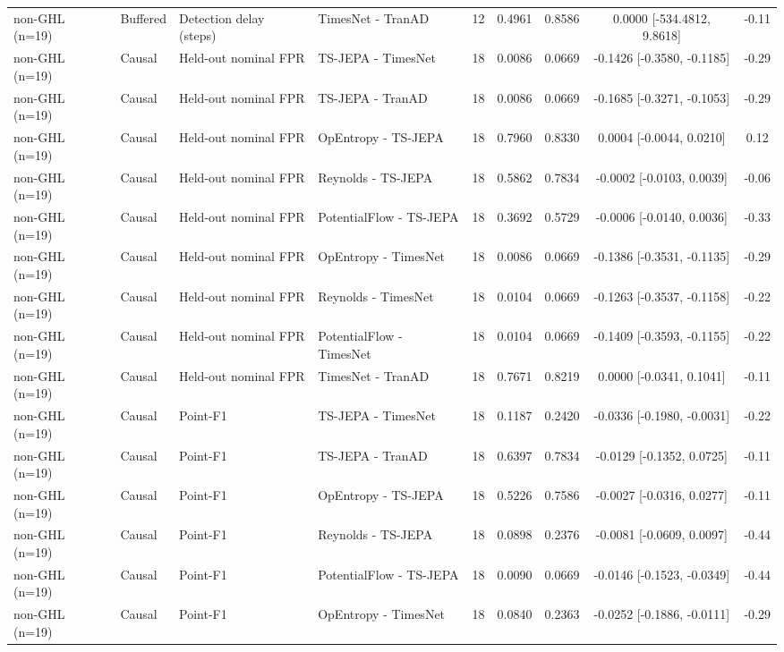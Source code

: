 \begin{table}[t]
\begin{tabular}{@{}llllccccc@{}}
non-GHL (n=19) & Buffered & Detection delay (steps) & TimesNet - TranAD & 12 & 0.4961 & 0.8586 & 0.0000 [-534.4812, 9.8618] & -0.11 \\
non-GHL (n=19) & Causal & Held-out nominal FPR & TS-JEPA - TimesNet & 18 & 0.0086 & 0.0669 & -0.1426 [-0.3580, -0.1185] & -0.29 \\
non-GHL (n=19) & Causal & Held-out nominal FPR & TS-JEPA - TranAD & 18 & 0.0086 & 0.0669 & -0.1685 [-0.3271, -0.1053] & -0.29 \\
non-GHL (n=19) & Causal & Held-out nominal FPR & OpEntropy - TS-JEPA & 18 & 0.7960 & 0.8330 & 0.0004 [-0.0044, 0.0210] & 0.12 \\
non-GHL (n=19) & Causal & Held-out nominal FPR & Reynolds - TS-JEPA & 18 & 0.5862 & 0.7834 & -0.0002 [-0.0103, 0.0039] & -0.06 \\
non-GHL (n=19) & Causal & Held-out nominal FPR & PotentialFlow - TS-JEPA & 18 & 0.3692 & 0.5729 & -0.0006 [-0.0140, 0.0036] & -0.33 \\
non-GHL (n=19) & Causal & Held-out nominal FPR & OpEntropy - TimesNet & 18 & 0.0086 & 0.0669 & -0.1386 [-0.3531, -0.1135] & -0.29 \\
non-GHL (n=19) & Causal & Held-out nominal FPR & Reynolds - TimesNet & 18 & 0.0104 & 0.0669 & -0.1263 [-0.3537, -0.1158] & -0.22 \\
non-GHL (n=19) & Causal & Held-out nominal FPR & PotentialFlow - TimesNet & 18 & 0.0104 & 0.0669 & -0.1409 [-0.3593, -0.1155] & -0.22 \\
non-GHL (n=19) & Causal & Held-out nominal FPR & TimesNet - TranAD & 18 & 0.7671 & 0.8219 & 0.0000 [-0.0341, 0.1041] & -0.11 \\
non-GHL (n=19) & Causal & Point-F1 & TS-JEPA - TimesNet & 18 & 0.1187 & 0.2420 & -0.0336 [-0.1980, -0.0031] & -0.22 \\
non-GHL (n=19) & Causal & Point-F1 & TS-JEPA - TranAD & 18 & 0.6397 & 0.7834 & -0.0129 [-0.1352, 0.0725] & -0.11 \\
non-GHL (n=19) & Causal & Point-F1 & OpEntropy - TS-JEPA & 18 & 0.5226 & 0.7586 & -0.0027 [-0.0316, 0.0277] & -0.11 \\
non-GHL (n=19) & Causal & Point-F1 & Reynolds - TS-JEPA & 18 & 0.0898 & 0.2376 & -0.0081 [-0.0609, 0.0097] & -0.44 \\
non-GHL (n=19) & Causal & Point-F1 & PotentialFlow - TS-JEPA & 18 & 0.0090 & 0.0669 & -0.0146 [-0.1523, -0.0349] & -0.44 \\
non-GHL (n=19) & Causal & Point-F1 & OpEntropy - TimesNet & 18 & 0.0840 & 0.2363 & -0.0252 [-0.1886, -0.0111] & -0.29 \\

\end{tabular}
\end{table}

